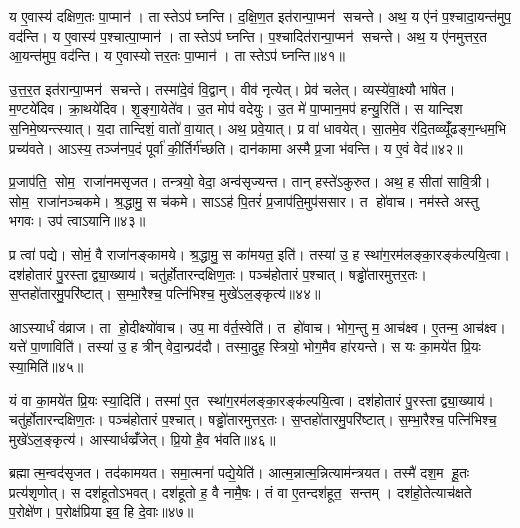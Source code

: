य ए॒वास्य॑ दक्षिण॒तः पा॒प्मान॑। तास्तेऽप॑ घ्नन्ति। द॒क्षि॒ण॒त इत॑रान्पा॒प्मन॑ सचन्ते। अथ॒ य ए॑नं प॒श्चादा॒यन्त॑मुप॒ वद॑न्ति। य ए॒वास्य॑ प॒श्चात्पा॒प्मान॑। तास्तेऽप॑ घ्नन्ति। प॒श्चादित॑रान्पा॒प्मन॑ सचन्ते। अथ॒ य ए॑नमुत्तर॒त आ॒यन्त॑मुप॒ वद॑न्ति। य ए॒वास्योत्तर॒तः पा॒प्मान॑। तास्तेऽप॑ घ्नन्ति॥४१॥

उ॒त्त॒र॒त इत॑रान्पा॒प्मन॑ सचन्ते। तस्मा॑दे॒वं वि॒द्वान्। वीव॑ नृत्येत्। प्रेव॑ चलेत्। व्यस्ये॑वा॒क्ष्यौ भा॑षेत। म॒ण्टये॑दिव। क्रा॒थये॑दिव। शृ॒ङ्गा॒येते॑व। उ॒त मोप॑ वदेयुः। उ॒त मे॑ पा॒प्मान॒मप॑ हन्यु॒रिति॑। स यान्दिश स॒निमे॒ष्यन्त्स्यात्। य॒दा तान्दिशं॒ वातो॑ वा॒यात्। अथ॒ प्रवे॒यात्। प्र वा॑ धावयेत्। सा॒तमे॒व र॑दि॒तव्व्यूँ॑ढङ्ग॒न्धम॒भि प्रच्य॑वते। आऽस्य॒ तञ्ज॑नप॒दं पूर्वा॑ की॒र्तिर्ग॑च्छति। दान॑कामा अस्मै प्र॒जा भ॑वन्ति। य ए॒वं वेद॑॥४२॥\anuvakamend[वेद॒ सं प॑वत आदि॒त्यात्प॑वते वा॒त्या वात्ये॒ष पव॑मान ए॒व द॑क्षिण॒त आ॒यन्त॑मुप॒ वद॑न्त्युत्तर॒तः पा॒प्मान॒स्ता स्तेप॑ घ्न॒न्तीत्य॒ष्टौ च॑]

प्र॒जाप॑ति॒ सोम॒ राजा॑नमसृजत। तन्त्रयो॒ वेदा॒ अन्व॑सृज्यन्त। तान् हस्ते॑ऽकुरुत। अथ॒ ह सीता॑ सावि॒त्री। सोम॒ राजा॑नञ्चकमे। श्र॒द्धामु॒ स च॑कमे। साऽऽह॑ पि॒तरं॑ प्र॒जाप॑ति॒मुप॑ससार। त हो॑वाच। नम॑स्ते अस्तु भगवः। उप॑ त्वाऽयानि॥४३॥

प्र त्वा॑ पद्ये। सोमं॒ वै राजा॑नङ्कामये। श्र॒द्धामु॒ स का॑मयत॒ इति॑। तस्या॑ उ॒ ह स्था॑ग॒रम॑लङ्का॒रङ्क॑ल्पयि॒त्वा। दश॑होतारं पु॒रस्ताद्व्या॒ख्याय॑। चतु॑र्\mbox{}होतारन्दक्षिण॒तः। पञ्च॑होतारं प॒श्चात्। षड्ढो॑तारमुत्तर॒तः। स॒प्तहो॑तारमु॒परि॑ष्टात्। स॒म्भा॒रैश्च॒ पत्नि॑भिश्च॒ मुखे॑ऽल॒ङ्कृत्य॑॥४४॥

आऽस्यार्धं व॑व्राज। ता हो॒दीक्ष्यो॑वाच। उप॒ मा व॑र्त॒स्वेति॑। त हो॑वाच। भोग॒न्तु म॒ आच॑क्ष्व। ए॒तन्म॒ आच॑क्ष्व। यत्ते॑ पा॒णाविति॑। तस्या॑ उ॒ ह त्रीन् वेदा॒न्प्रद॑दौ। तस्मा॒दुह॒ स्त्रियो॒ भोग॒मैव हा॑रयन्ते। स यः का॒मये॑त प्रि॒यः स्या॒मिति॑॥४५॥

यं वा का॒मये॑त प्रि॒यः स्या॒दिति॑। तस्मा॑ ए॒त स्था॑ग॒रम॑लङ्का॒रङ्क॑ल्पयि॒त्वा। दश॑होतारं पु॒रस्ताद्व्या॒ख्याय॑। चतु॑र्\mbox{}होतारन्दक्षिण॒तः। पञ्च॑होतारं प॒श्चात्। षड्ढो॑तारमुत्तर॒तः। स॒प्तहो॑तारमु॒परि॑ष्टात्। स॒म्भा॒रैश्च॒ पत्नि॑भिश्च॒ मुखे॑ऽल॒ङ्कृत्य॑। आस्यार्धव्व्रँ॑जेत्। प्रि॒यो है॒व भ॑वति॥४६॥\anuvakamend[अ॒या॒न्य॒ल॒ङ्कृत्य॑ स्या॒मिति॑ भवति]

ब्रह्मात्म॒न्वद॑सृजत। तद॑कामयत। समा॒त्मना॑ पद्ये॒येति॑। आत्म॒न्नात्म॒न्नित्याम॑न्त्रयत। तस्मै॑ दश॒म हू॒तः प्रत्य॑शृणोत्। स दश॑हूतोऽभवत्। दश॑हूतो ह॒ वै नामै॒षः। तं वा ए॒तन्दश॑हूत॒ सन्तम्। दश॑हो॒तेत्याच॑क्षते प॒रोक्षे॑ण। प॒रोक्ष॑प्रिया इव॒ हि दे॒वाः॥४७॥


